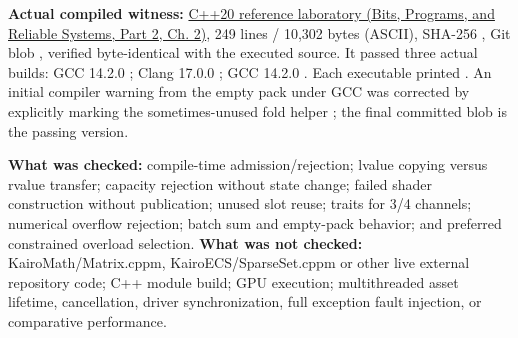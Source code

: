 \textbf{Actual compiled witness:} \href{../01-Bits-Programs-and-Reliable-Systems-P02/main.pdf\#source-file-a5db53514d74ae247b4ac42f}{C++20 reference laboratory (Bits, Programs, and Reliable Systems, Part 2, Ch. 2)}, 249 lines / 10,302 bytes (ASCII), SHA-256 , Git blob , verified byte-identical with the executed source. It passed three actual builds: GCC 14.2.0 ; Clang 17.0.0 ; GCC 14.2.0 . Each executable printed . An initial compiler warning from the empty pack under GCC  was corrected by explicitly marking the sometimes-unused fold helper ; the final committed blob is the passing version.

\textbf{What was checked:} compile-time admission/rejection; lvalue copying versus rvalue transfer; capacity rejection without state change; failed shader construction without publication; unused slot reuse; traits for 3/4 channels; numerical overflow rejection; batch sum and empty-pack behavior; and preferred constrained overload selection. \textbf{What was not checked:} KairoMath/Matrix.cppm, KairoECS/SparseSet.cppm or other live external repository code; C++ module build; GPU execution; multithreaded asset lifetime, cancellation, driver synchronization, full exception fault injection, or comparative performance.


